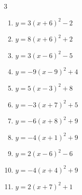 \begin{multicols}{3}
\begin{enumerate}
        \phantom{$\displaystyle 頂点\left( -9 , -3 \right)$}

  \item $\displaystyle y=3\left( x+6\right)^{2}-2$

        \phantom{$\displaystyle 頂点\left( -6 , -2 \right)$}

  \item $\displaystyle y=8\left( x+6\right)^{2}+2$

        \phantom{$\displaystyle 頂点\left( -6 , 2 \right)$}

  \item $\displaystyle y=3\left( x-6\right)^{2}-5$

        \phantom{$\displaystyle 頂点\left( 6 , -5 \right)$}

  \item $\displaystyle y=-9\left( x-9\right)^{2}+4$

        \phantom{$\displaystyle 頂点\left( 9 , 4 \right)$}

  \item $\displaystyle y=5\left( x-3\right)^{2}+8$

        \phantom{$\displaystyle 頂点\left( 3 , 8 \right)$}

  \item $\displaystyle y=-3\left( x+7\right)^{2}+5$

        \phantom{$\displaystyle 頂点\left( -7 , 5 \right)$}

  \item $\displaystyle y=-6\left( x+8\right)^{2}+9$

        \phantom{$\displaystyle 頂点\left( -8 , 9 \right)$}

  \item $\displaystyle y=-4\left( x+1\right)^{2}+9$

        \phantom{$\displaystyle 頂点\left( -1 , 9 \right)$}

  \item $\displaystyle y=2\left( x-6\right)^{2}-6$

        \phantom{$\displaystyle 頂点\left( 6 , -6 \right)$}

  \item $\displaystyle y=-4\left( x+4\right)^{2}+9$

        \phantom{$\displaystyle 頂点\left( -4 , 9 \right)$}

  \item $\displaystyle y=2\left( x+7\right)^{2}+1$

        \phantom{$\displaystyle 頂点\left( -7 , 1 \right)$}


\end{enumerate}
\end{multicols}
